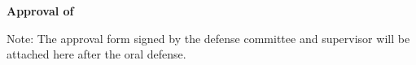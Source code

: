 \clearpage
\thispagestyle{cityu}

\begin{center}
  \vspace*{3.0cm}
  {\fontsize{18pt}{27pt}\selectfont\bfseries Approval of \thesistype\par}
\end{center}

\vspace{2.0cm}

\noindent
Note: The approval form signed by the defense committee and supervisor will be attached here after the oral defense.
